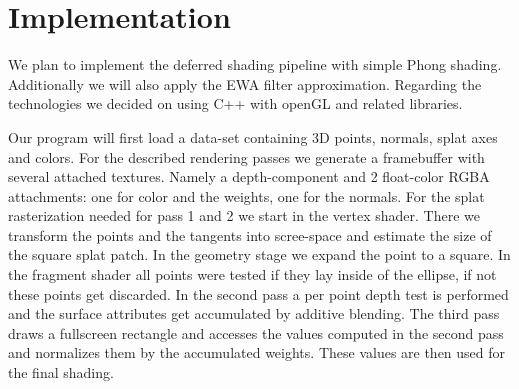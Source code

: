 \documentclass[12pt,a4paper]{article}
\begin{document}
\section{Implementation}
We plan to implement the deferred shading pipeline with simple Phong shading. Additionally we will also apply the EWA filter approximation. Regarding the technologies we decided on using C++ with openGL and related libraries.

Our program will first load a data-set containing 3D points, normals, splat axes and colors. For the described rendering passes we generate a framebuffer with several attached textures. Namely a depth-component and 2 float-color RGBA attachments: one for color and the weights, one for the normals. For the splat rasterization needed for pass 1 and 2 we start in the vertex shader. There we transform the points and the tangents into scree-space and estimate the size of the square splat patch. In the geometry stage we expand the point to a square. In the fragment shader all points were tested if they lay inside of the ellipse, if not these points get discarded. In the second pass a per point depth test is performed and the surface attributes get accumulated by additive blending. The third pass draws a fullscreen rectangle and accesses the values computed in the second pass and normalizes them by the accumulated weights. These values are then used for the final shading.
\end{document}
